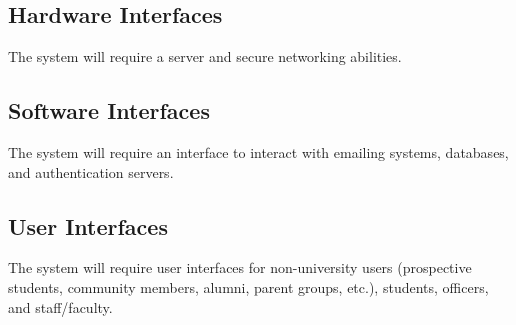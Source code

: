 \documentclass[12pt, oneside, letterpaper]{report}
\begin{document}
		\subsection{Hardware Interfaces}
			The system will require a server and secure networking
			abilities.
		\subsection{Software Interfaces}
			The system will require an interface to interact with
			emailing systems, databases, and authentication servers.
		\subsection{User Interfaces}
			The system will require user interfaces for non-university
			users (prospective students, community members, alumni,
			parent groups, etc.), students, officers, and staff/faculty.
\end{document}

